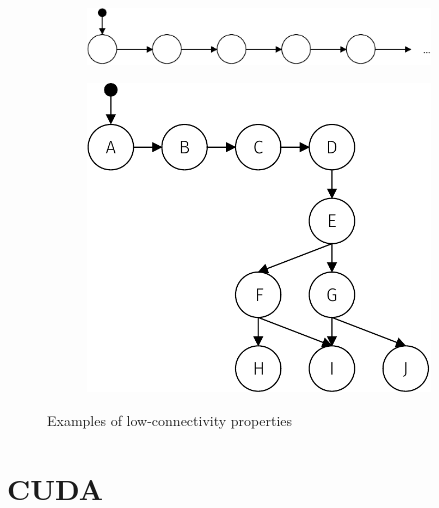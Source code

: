 \documentclass[
fancyheadings, %
%
%
]{stsreprt}
\begin{document}
\begin{figure}
    \begin{subfigure}[b]{.5\textwidth}
        \centering
        \includegraphics[width=\textwidth]{figures/lc-ex-generally-linear}
        \label{fig:lc-ex-generally-linear}
    \end{subfigure}
    \begin{subfigure}[b]{.5\textwidth}
        \centering
        \includegraphics[width=.9\textwidth]{figures/lc-ex-bottleneck}
        \label{fig:lc-ex-bottleneck}
    \end{subfigure}
    \caption{Examples of low-connectivity properties}
    \label{fig:lc-ex}
\end{figure}

\section{CUDA}
\label{section:background:cuda}
\end{document}

